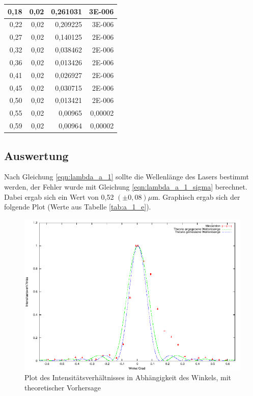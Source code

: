 \documentclass[12pt]{scrartcl}
\begin{document}
\begin{table}[H]
\begin{center}
\begin{tabular}{|r|r|r|r|}
0,18 & 0,02 & 0,261031 & 3E-006 \\ \hline
0,22 & 0,02 & 0,209225 & 3E-006 \\ \hline
0,27 & 0,02 & 0,140125 & 2E-006 \\ \hline
0,32 & 0,02 & 0,038462 & 2E-006 \\ \hline
0,36 & 0,02 & 0,013426 & 2E-006 \\ \hline
0,41 & 0,02 & 0,026927 & 2E-006 \\ \hline
0,45 & 0,02 & 0,030715 & 2E-006 \\ \hline
0,50 & 0,02 & 0,013421 & 2E-006 \\ \hline
0,55 & 0,02 & 0,00965 & 0,00002 \\ \hline
0,59 & 0,02 & 0,00964 & 0,00002 \\ \hline
\end{tabular}
\end{center}
\label{tab:a_1_m}
\end{table}



\subsection{Auswertung}
Nach Gleichung \ref{eqn:lambda_a_1} sollte die Wellenlänge des Lasers bestimmt werden, der Fehler wurde mit Gleichung \ref{eqn:lambda_a_1_sigma} berechnet. Dabei ergab sich ein Wert von 0,52 $(\pm 0,08) \mu$m. Graphisch ergab sich der folgende Plot (Werte aus Tabelle \ref{tab:a_1_e}).

\begin{figure}[H]
\centering
    \includegraphics[scale = 1]{a_1.pdf}
  	\caption[Plot des Intensitätsverhältnisses in Abhängigkeit des Winkels, mit theoretischer Vorhersage]{Plot des Intensitätsverhältnisses in Abhängigkeit des Winkels, mit theoretischer Vorhersage}
  \label{fig:a_1}
\end{figure}
\end{document}
